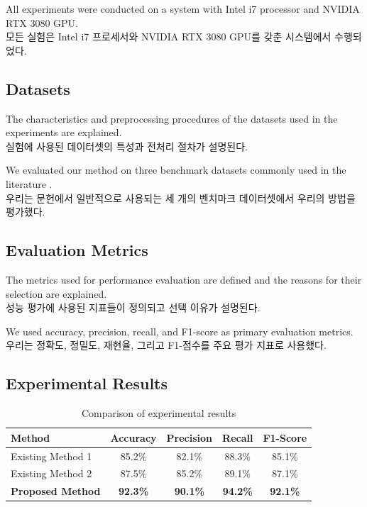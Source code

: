 \documentclass[12pt,a4paper]{article}
\begin{document}
All experiments were conducted on a system with Intel i7 processor and NVIDIA RTX 3080 GPU. \\
모든 실험은 Intel i7 프로세서와 NVIDIA RTX 3080 GPU를 갖춘 시스템에서 수행되었다.

\subsection{Datasets}
The characteristics and preprocessing procedures of the datasets used in the experiments are explained. \\
실험에 사용된 데이터셋의 특성과 전처리 절차가 설명된다.

We evaluated our method on three benchmark datasets commonly used in the literature \cite{deng2009imagenet}. \\
우리는 문헌에서 일반적으로 사용되는 세 개의 벤치마크 데이터셋에서 우리의 방법을 평가했다.

\subsection{Evaluation Metrics}
The metrics used for performance evaluation are defined and the reasons for their selection are explained. \\
성능 평가에 사용된 지표들이 정의되고 선택 이유가 설명된다.

We used accuracy, precision, recall, and F1-score as primary evaluation metrics. \\
우리는 정확도, 정밀도, 재현율, 그리고 F1-점수를 주요 평가 지표로 사용했다.

\subsection{Experimental Results}
\begin{table}[htbp]
\centering
\caption{Comparison of experimental results}
\label{tab:results}
\begin{tabular}{@{}lcccc@{}}
\toprule
Method & Accuracy & Precision & Recall & F1-Score \\
\midrule
Existing Method 1 & 85.2\% & 82.1\% & 88.3\% & 85.1\% \\
Existing Method 2 & 87.5\% & 85.2\% & 89.1\% & 87.1\% \\
\textbf{Proposed Method} & \textbf{92.3\%} & \textbf{90.1\%} & \textbf{94.2\%} & \textbf{92.1\%} \\
\bottomrule
\end{tabular}
\end{table}
\end{document}

